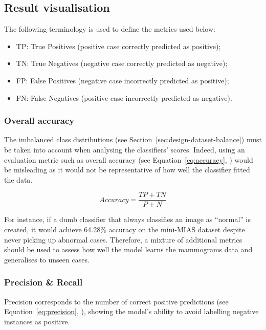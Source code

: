 
\subsection{Result visualisation}
\label{sec:design-results-visualisation}

The following terminology is used to define the metrics used below:
\begin{itemize}
    \item TP: True Positives (positive case correctly predicted as positive);
    \item TN: True Negatives (negative case correctly predicted as negative);
    \item FP: False Positives (negative case incorrectly predicted as positive);
    \item FN: False Negatives (positive case incorrectly predicted as negative).
\end{itemize}

\subsubsection{Overall accuracy}

The imbalanced class distributions (see Section~\ref{sec:design-dataset-balance}) must be taken into account when analysing the classifiers' scores. Indeed, using an evaluation metric such as overall accuracy (see Equation~\ref{eq:accuracy}, \cite{Falconi2019}) would be misleading as it would not be representative of how well the classifier fitted the data.

\begin{equation}
\label{eq:accuracy}
    Accuracy = \frac{TP + TN}{P + N}
\end{equation}

For instance, if a dumb classifier that always classifies an image as ``normal'' is created, it would achieve 64.28\% accuracy on the mini-MIAS dataset despite  never picking up abnormal cases. Therefore, a mixture of additional metrics should be used to assess how well the model learns the mammograms data and generalises to unseen cases.

\subsubsection{Precision \& Recall}

Precision corresponds to the number of correct positive predictions (see Equation~\ref{eq:precision}, \cite{Liu2009}), showing the model's ability to avoid labelling negative instances as positive. 

